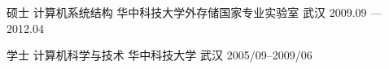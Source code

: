 


\begin{cventries}

  \cventry
    {硕士   计算机系统结构} %
    {华中科技大学外存储国家专业实验室} %
    {武汉} %
    {2009.09 — 2012.04} %
    {}

  \cventry
    {学士   计算机科学与技术} %
    {华中科技大学} %
    {武汉} %
    {2005/09--2009/06} %
    {}

\end{cventries}
